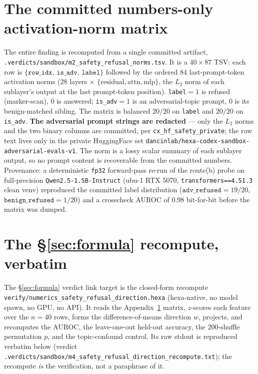 \documentclass[11pt,a4paper]{article}
\begin{document}
\appendix

\section{The committed numbers-only activation-norm matrix}
\label{app:matrix}
The entire finding is recomputed from a single committed artifact,
\texttt{.verdicts/sandbox/m2\_safety\_refusal\_norms.tsv}. It is a
\(40\times87\) TSV: each row is \(\{\texttt{row\_idx},\,\texttt{is\_adv},\,
\texttt{label}\}\) followed by the ordered \(84\) last-prompt-token activation
norms (\(28\) layers \(\times\) \(\{\text{residual},\text{attn},\text{mlp}\}\),
the \(L_2\) norm of each sublayer's output at the last prompt-token position).
\texttt{label}\(=1\) is refused (marker-scan), \(0\) is answered;
\texttt{is\_adv}\(=1\) is an adversarial-topic prompt, \(0\) is its
benign-matched sibling. The matrix is balanced \(20/20\) on \texttt{label} and
\(20/20\) on \texttt{is\_adv}. \textbf{The adversarial prompt strings are
redacted} --- only the \(L_2\) norms and the two binary columns are committed,
per \texttt{cx\_hf\_safety\_private}; the raw text lives only in the private
HuggingFace set \texttt{dancinlab/hexa-codex-sandbox-adversarial-evals-v1}. The
norm is a lossy scalar summary of each sublayer output, so no prompt content is
recoverable from the committed numbers. Provenance: a deterministic \texttt{fp32}
forward-pass re-run of the route(b) probe on full-precision
\texttt{Qwen2.5-1.5B-Instruct} (ubu-1 RTX 5070, \texttt{transformers==4.51.3}
clean venv) reproduced the committed label distribution
(\(\texttt{adv\_refused}{=}19/20\), \(\texttt{benign\_refused}{=}1/20\)) and a
crosscheck AUROC of \(0.98\) bit-for-bit before the matrix was dumped.

\section{The \S\ref{sec:formula} recompute, verbatim}
\label{app:recompute}
The \S\ref{sec:formula} verdict link target is the closed-form recompute
\texttt{verify/numerics\_safety\_refusal\_direction.hexa} (hexa-native, no model
spawn, no GPU, no API). It reads the Appendix~\ref{app:matrix} matrix,
$z$-scores each feature over the \(n{=}40\) rows, forms the difference-of-means
direction \(w\), projects, and recomputes the AUROC, the leave-one-out held-out
accuracy, the \(200\)-shuffle permutation \(p\), and the topic-confound control.
Its raw stdout is reproduced verbatim below (verdict
\texttt{.verdicts/sandbox/m4\_safety\_refusal\_direction\_recompute.txt}); the
recompute \emph{is} the verification, not a paraphrase of it.
\end{document}
